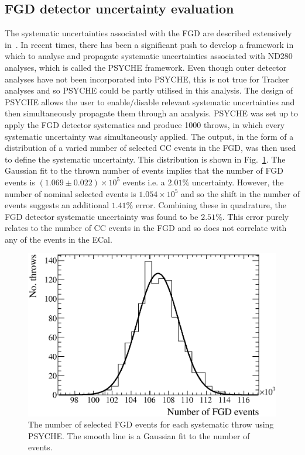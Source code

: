 \subsection{FGD detector uncertainty evaluation}
\label{subsec:FGDDetectorSystematics}
The systematic uncertainties associated with the FGD are described extensively in~\cite{CCIncSelFGDTN}.  In recent times, there has been a significant push to develop a framework in which to analyse and propagate systematic uncertainties associated with ND280 analyses, which is called the PSYCHE framework.  Even though outer detector analyses have not been incorporated into PSYCHE, this is not true for Tracker analyses and so PSYCHE could be partly utilised in this analysis.  The design of PSYCHE allows the user to enable/disable relevant systematic uncertainties and then simultaneously propagate them through an analysis.  PSYCHE was set up to apply the FGD detector systematics and produce 1000 throws, in which every systematic uncertainty was simultaneously applied.  The output, in the form of a distribution of a varied number of selected CC events in the FGD, was then used to define the systematic uncertainty.  This distribution is shown in Fig.~\ref{fig:FGDSystematicsNEvents}.  The Gaussian fit to the thrown number of events implies that the number of FGD events is $(1.069\pm0.022)\times10^5$ events i.e. a $2.01\%$ uncertainty.  However, the number of nominal selected events is $1.054\times10^5$ and so the shift in the number of events suggests an additional $1.41\%$ error.  Combining these in quadrature, the FGD detector systematic uncertainty was found to be $2.51\%$.  This error purely relates to the number of CC events in the FGD and so does not correlate with any of the events in the ECal.
\begin{figure}
  \centering
  \includegraphics[width=12cm]{images/measurement/systematics/detector/fgd/fgd_systematics_nevents.eps}
  \caption{The number of selected FGD events for each systematic throw using PSYCHE.  The smooth line is a Gaussian fit to the number of events.}
  \label{fig:FGDSystematicsNEvents}
\end{figure}
